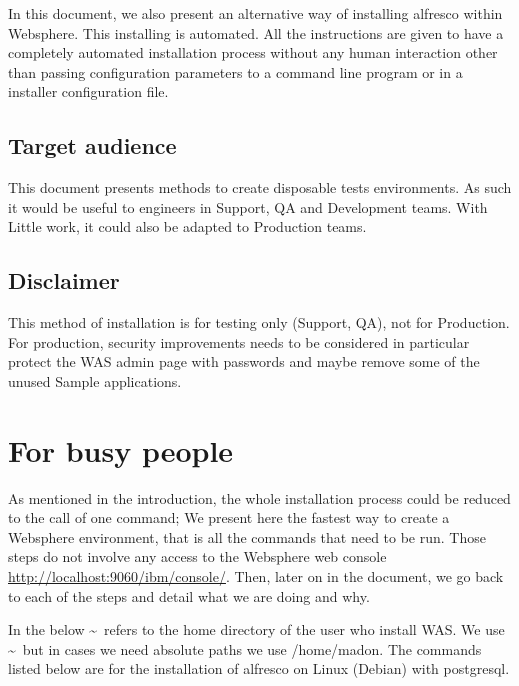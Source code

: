 \documentclass[10pt,a4]{article}
\begin{document}
In this document, we also present an alternative way of installing alfresco within Websphere. This installing is automated. All the instructions are given to have a completely automated installation process without any human interaction other than passing configuration parameters to a command line program or in a installer configuration file.


\subsection{Target audience}
This document presents methods to create disposable tests environments. As such it would be useful to engineers in Support, QA and Development teams. With Little work, it could also be adapted to Production teams.

\subsection{Disclaimer}
This method of installation is for testing only (Support, QA), not for Production. For production, security improvements needs to be considered in particular protect the WAS admin page with passwords and maybe remove some of the unused Sample applications.


\section{For busy people}
As mentioned in the introduction, the whole installation process could be reduced to the call of one command; We present here the fastest way to create a Websphere environment, that is all the commands that need to be run. Those steps do not involve any access to the Websphere web console \url{http://localhost:9060/ibm/console/}. Then, later on in the document, we go back to each of the steps and detail what we are doing and why.


In the below  \textasciitilde\  refers to the home directory of the user who install WAS. We use \textasciitilde\  but in cases we need absolute paths we use /home/madon. The commands listed below are for the installation of alfresco on Linux (Debian) with postgresql.
\end{document}
